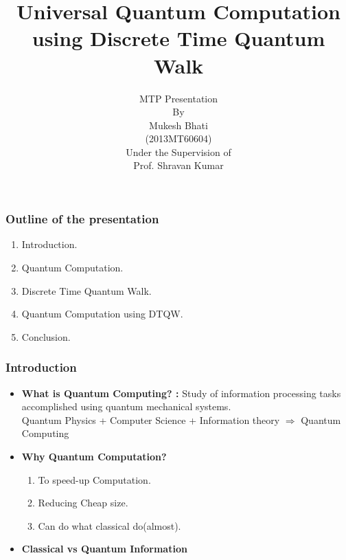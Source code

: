 \documentclass[xcolor=svgnames]{beamer}
\title{Universal Quantum Computation using Discrete Time Quantum Walk}
\author[MTP Presentation]{MTP Presentation\\[0.5em]
{\scriptsize{By}}\\
[0.5em] Mukesh Bhati \\
(2013MT60604)\\
[0.5em]
{\scriptsize{Under the Supervision of }}\\
[0.5em] Prof. Shravan Kumar\\[2em]}
\institute[] {\scriptsize{Indian Institute of Technology\\  Delhi \\
[0.7em] }}
\date[July, 2018]{}
\newcommand{\imply}{\Rightarrow}
\begin{document}
\frame{\titlepage}


\begin{frame}
\frametitle{Outline of the presentation}
\begin{enumerate}
\item Introduction.
\item Quantum Computation.
\item Discrete Time Quantum Walk.
\item Quantum Computation using DTQW.
\item Conclusion.
\end{enumerate}
\end{frame}

\begin{frame}\frametitle{Introduction}
\begin{itemize}
\item \textbf{What is Quantum Computing? : } Study of information processing tasks accomplished using quantum mechanical systems.\\
Quantum Physics + Computer Science + Information theory $\imply$ Quantum   Computing
\item \textbf{Why Quantum Computation? }
\begin{enumerate}
\item To speed-up Computation.
\item Reducing Cheap size.
\item Can do what classical do(almost).
\end{enumerate}
\item \textbf{Classical vs Quantum Information}
\end{itemize}

\end{frame}
\end{document}

